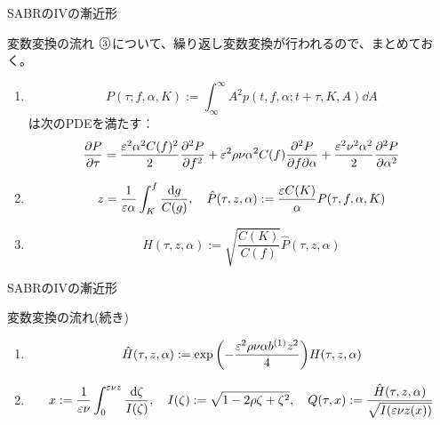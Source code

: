 \documentclass[dvipdfmx,9pt]{beamer}
\begin{document}
\begin{frame}{SABRのIVの漸近形}
  \begin{block}{変数変換の流れ}
    $\raise0.2ex\hbox{\textcircled{\scriptsize{3}}}$について、繰り返し変数変換が行われるので、まとめておく。
    \begin{enumerate}
      \item
            \begin{equation}
              P(\tau ; f,\alpha,K) := \int_{\infty}^{\infty} A^{2} p(t,f,\alpha ; t + \tau ,K,A) \dd A
            \end{equation}
            は次のPDEを満たす︰
            \begin{equation}
              \pdv{P}{\tau} = \frac{\varepsilon^{2}\alpha^{2}C(f)^{2}}{2}\pdv[2]{P}{f} + \varepsilon^{2} \rho \nu \alpha^{2} C(f) \pdv{P}{f}{\alpha} + \frac{\varepsilon^{2}\nu^{2}\alpha^{2}}{2}\pdv[2]{P}{\alpha}
            \end{equation}
      \item
            \begin{equation}
              z = \frac{1}{\varepsilon\alpha}\int^{f}_{K}\frac{\dd g}{C(g)} , \quad \hat{P}(\tau,z,\alpha) := \frac{\varepsilon C(K)}{\alpha} P(\tau,f,\alpha,K)
            \end{equation}
      \item \begin{equation}
              H(\tau,z,\alpha) := \sqrt{\frac{C(K)}{C(f)}}\hat{P}(\tau,z,\alpha)
            \end{equation}
    \end{enumerate}
  \end{block}
\end{frame}

\begin{frame}{SABRのIVの漸近形}
  \begin{block}{変数変換の流れ(続き)}
    \begin{enumerate}
      \setcounter{enumi}{3}
      \item
            \begin{equation}
              \hat{H}(\tau,z,\alpha) := \expi{-\frac{\ep^{2}\rho\nu\alpha b^{(1)}z^{2}}{4}}H(\tau,z,\alpha)
            \end{equation}
      \item
            \begin{equation}
              x := \frac{1}{\varepsilon\nu}\int_{0}^{\varepsilon\nu z}\frac{\dd \zeta}{I(\zeta)}, \quad
              I(\zeta) := \sqrt{1 - 2\rho\zeta + \zeta^{2}}, \quad
              Q(\tau, x) := \frac{\hat{H}(\tau,z,\alpha)}{\sqrt{I(\varepsilon\nu z(x))}}
            \end{equation}
    \end{enumerate}
  \end{block}
\end{frame}
\end{document}

